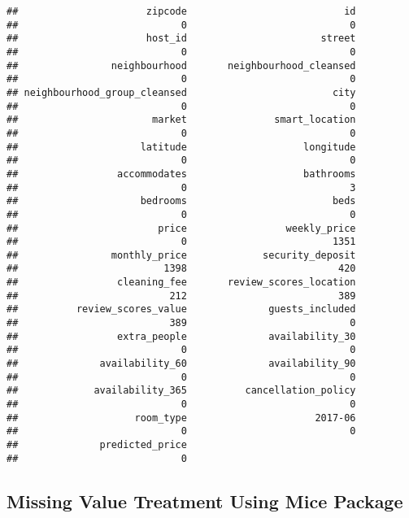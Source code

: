 \documentclass[
]{article}
\begin{document}
\begin{verbatim}
##                      zipcode                           id 
##                            0                            0 
##                      host_id                       street 
##                            0                            0 
##                neighbourhood       neighbourhood_cleansed 
##                            0                            0 
## neighbourhood_group_cleansed                         city 
##                            0                            0 
##                       market               smart_location 
##                            0                            0 
##                     latitude                    longitude 
##                            0                            0 
##                 accommodates                    bathrooms 
##                            0                            3 
##                     bedrooms                         beds 
##                            0                            0 
##                        price                 weekly_price 
##                            0                         1351 
##                monthly_price             security_deposit 
##                         1398                          420 
##                 cleaning_fee       review_scores_location 
##                          212                          389 
##          review_scores_value              guests_included 
##                          389                            0 
##                 extra_people              availability_30 
##                            0                            0 
##              availability_60              availability_90 
##                            0                            0 
##             availability_365          cancellation_policy 
##                            0                            0 
##                    room_type                      2017-06 
##                            0                            0 
##              predicted_price 
##                            0
\end{verbatim}

\hypertarget{missing-value-treatment-using-mice-package}{%
\subsection{Missing Value Treatment Using Mice
Package}\label{missing-value-treatment-using-mice-package}}
\end{document}
